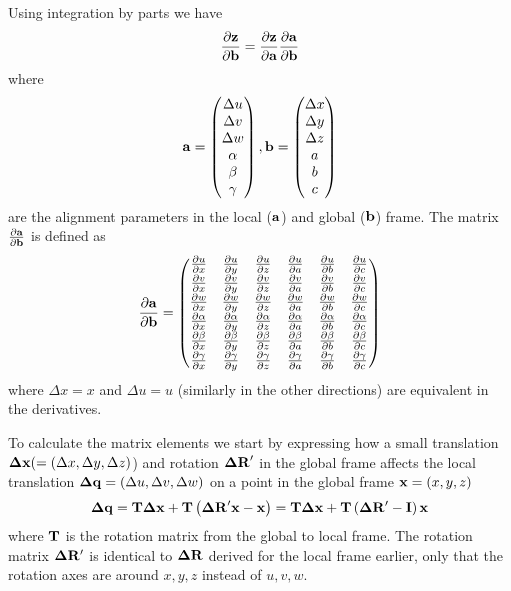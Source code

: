 \documentclass{article}
\def\vec#1{\ensuremath{\mathrm{\bf #1}}}
\def\partder#1#2{\ensuremath{\frac{\partial #1}{\partial #2}}}
\begin{document}
Using integration by parts we have
\begin{equation}
\partder{\vec{z}}{\vec{b}} =  \partder{\vec{z}}{\vec{a}} \partder{\vec{a}}{\vec{b}} \nonumber
\end{equation}
where 
\[
\vec{a}= 
\begin{pmatrix}
\Delta u \\
\Delta v \\
\Delta w \\
\alpha \\
\beta \\
\gamma 
\end{pmatrix},
\vec{b}= 
\begin{pmatrix}
\Delta x \\
\Delta y \\
\Delta z \\
a \\
b \\
c 
\end{pmatrix}
\]
are the alignment parameters in the local (\vec{a}) and global (\vec{b}) frame. The matrix 
$\partder{\vec{a}}{\vec{b}}$ is defined as
\[
\partder{\vec{a}}{\vec{b}}= 
\begin{pmatrix}
\partder{u}{x} & \partder{u}{y} & \partder{u}{z} & \partder{u}{a} & \partder{u}{b} & \partder{u}{c}  \\ 
\partder{v}{x} & \partder{v}{y} & \partder{v}{z} & \partder{v}{a} & \partder{v}{b} & \partder{v}{c}  \\ 
\partder{w}{x} & \partder{w}{y} & \partder{w}{z} & \partder{w}{a} & \partder{w}{b} & \partder{w}{c}  \\ 
\partder{\alpha}{x} & \partder{\alpha}{y} & \partder{\alpha}{z} & \partder{\alpha}{a} & \partder{\alpha}{b} & \partder{\alpha}{c}  \\ 
\partder{\beta}{x} & \partder{\beta}{y} & \partder{\beta}{z} & \partder{\beta}{a} & \partder{\beta}{b} & \partder{\beta}{c}  \\ 
\partder{\gamma}{x} & \partder{\gamma}{y} & \partder{\gamma}{z} & \partder{\gamma}{a} & \partder{\gamma}{b} & \partder{\gamma}{c} 
\end{pmatrix}
\]
where $\Delta x=x$ and $\Delta u=u$ (similarly in the other directions) are equivalent in the derivatives. 

To calculate the matrix elements we start by expressing how a small translation  
$\vec{\Delta x} (= \left ( \Delta x, \Delta y, \Delta z \right)$)  and rotation $\vec{\Delta R}'$  in the global 
frame affects the local translation $\vec{\Delta q} = \left ( \Delta u, \Delta v, \Delta w \right)$ 
on a point in the global frame $\vec{x}=\left( x,y,z \right)$
\begin{equation}
\vec{\Delta q} = \vec{T} \vec{\Delta x} + \vec{T}\left ( \vec{\vec{\Delta R}'} \vec{x}  - \vec{x}  \right) =  \vec{T} \vec{\Delta x} + \vec{T}\left ( \vec{\Delta R'}   - \vec{I}  \right)\vec{x}
\label{eq:dqdx}
\end{equation}
where $\vec{T}$ is the rotation matrix from the global to local frame. The rotation matrix $\vec{\Delta R'}$ is identical to $\vec{\Delta R}$  derived for the local frame earlier, only that the rotation axes are around $x,y,z$ instead of $u,v,w$.
\end{document}

